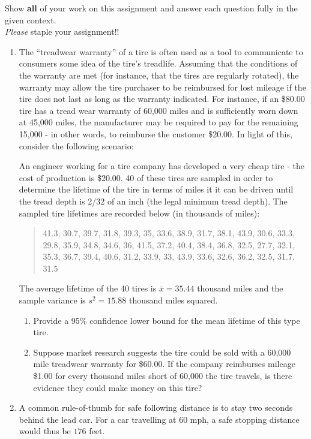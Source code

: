 \documentclass[11pt]{article}
\begin{document}
\pagestyle{fancy} 

Show \textbf{all} of your work on this assignment and answer each question fully in the given context. \\

\emph{Please} staple your assignment!! \\

\begin{enumerate}
\def\labelenumi{\arabic{enumi}.}
\item
  The ``treadwear warranty'' of a tire is often used as a tool to
  communicate to consumers some idea of the tire's treadlife. Assuming
  that the conditions of the warranty are met (for instance, that the
  tires are regularly rotated), the warranty may allow the tire
  purchaser to be reimbursed for lost mileage if the tire does not last
  as long as the warranty indicated. For instance, if an \$80.00 tire
  has a tread wear warranty of 60,000 miles and is sufficiently worn
  down at 45,000 miles, the manufacturer may be required to pay for the
  remaining 15,000 - in other words, to reimburse the customer \$20.00.
  In light of this, consider the following scenario:

  An engineer working for a tire company has developed a very cheap tire
  - the cost of production is \$20.00. 40 of these tires are sampled in
  order to determine the lifetime of the tire in terms of miles it it
  can be driven until the tread depth is 2/32 of an inch (the legal
  minimum tread depth). The sampled tire lifetimes are recorded below
  (in thousands of miles):

  \begin{quote}
  41.3, 30.7, 39.7, 31.8, 39.3, 35, 33.6, 38.9, 31.7, 38.1, 43.9, 30.6,
  33.3, 29.8, 35.9, 34.8, 34.6, 36, 41.5, 37.2, 40.4, 38.4, 36.8, 32.5,
  27.7, 32.1, 35.3, 36.7, 39.4, 40.6, 31.2, 33.9, 33, 43.9, 33.6, 32.6,
  36.2, 32.5, 31.7, 31.5
  \end{quote}

  The average lifetime of the 40 tires is \(\bar{x} = 35.44\) thousand
  miles and the sample variance is \(s^2 = 15.88\) thousand miles
  squared.

  \begin{enumerate}
  \def\labelenumii{\alph{enumii}.}
  \item
    Provide a 95\% confidence lower bound for the mean lifetime of this
    type tire.
  \item
    Suppose market research suggests the tire could be sold with a
    60,000 mile treadwear warranty for \$60.00. If the company
    reimburses mileage \$1.00 for every thousand miles short of 60,000
    the tire travels, is there evidence they could make money on this
    tire?
  \end{enumerate}
\item
  A common rule-of-thumb for safe following distance is to stay two
  seconds behind the lead car. For a car travelling at 60 mph, a safe
  stopping distance would thus be \(176\) feet.


\end{enumerate}
\end{document}
